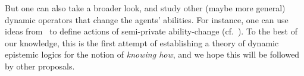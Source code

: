 But one can also take a broader look, and study other (maybe more general) dynamic operators that change the agents' abilities. For instance, one can use ideas from~\cite{BaltagMS98} to define actions of semi-private ability-change (cf.~\cite{GalimullinA22}). To the best of our knowledge, this is the first attempt of establishing a theory of dynamic epistemic logics for the notion of \emph{knowing how}, and we hope this will be followed by other proposals.
 
